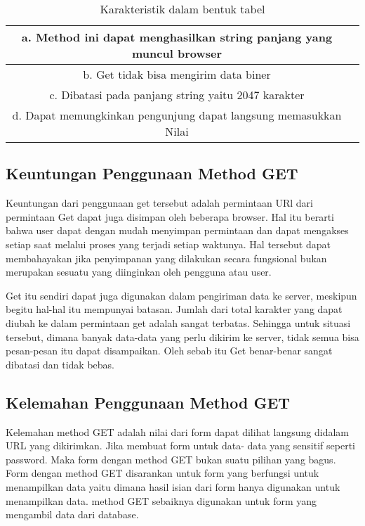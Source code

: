 \begin{table} [ht]
\caption{Karakteristik dalam bentuk tabel}
\centering
\begin {tabular} {|cc|}
\hline
a.	Method ini dapat menghasilkan string panjang yang muncul browser & \\
\hline
b.	Get tidak bisa mengirim data biner &\\
\hline
c.	Dibatasi pada panjang string yaitu 2047 karakter & \\
\hline
d.	Dapat memungkinkan pengunjung dapat langsung memasukkan Nilai & \\
\hline
\end{tabular}
\label{ltabel}
\end{table}

\subsection{Keuntungan Penggunaan Method GET}
Keuntungan dari penggunaan get tersebut adalah permintaan URl dari permintaan Get dapat juga disimpan oleh beberapa browser.
Hal itu berarti bahwa user dapat dengan mudah menyimpan permintaan dan dapat mengakses setiap saat melalui proses yang terjadi setiap 
waktunya. Hal tersebut dapat membahayakan jika penyimpanan yang dilakukan secara fungsional bukan merupakan sesuatu yang diinginkan oleh 
pengguna atau user.

Get itu sendiri dapat juga digunakan dalam pengiriman data ke server, meskipun begitu hal-hal itu mempunyai batasan. 
Jumlah dari total karakter yang dapat diubah ke dalam permintaan get adalah sangat terbatas. Sehingga untuk situasi tersebut, dimana 
banyak data-data yang perlu dikirim  ke server, tidak semua bisa pesan-pesan itu dapat disampaikan. Oleh sebab itu Get benar-benar 
sangat dibatasi dan tidak bebas.

\subsection{Kelemahan Penggunaan Method GET}
Kelemahan method GET adalah nilai dari form dapat dilihat langsung didalam URL yang dikirimkan. Jika membuat form untuk data-
data yang  sensitif seperti password. Maka form  dengan method GET bukan suatu pilihan yang bagus. Form dengan method GET 
disarankan untuk form yang berfungsi untuk menampilkan data  yaitu dimana hasil isian dari form hanya digunakan untuk  
menampilkan data. method GET sebaiknya digunakan untuk form yang mengambil data dari database.

